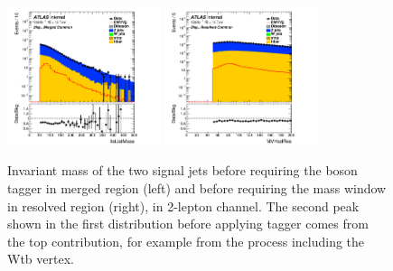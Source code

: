 \begin{figure}[H]
    \centering
     \includegraphics[width=0.40\textwidth]{figures/2lep/dataMC/C_0ptag1pfat0pjet_0ptv_MergedCommon_fatJetMass_Log} 
     \includegraphics[width=0.40\textwidth]{figures/2lep/dataMC/C_0ptag2pjet_0ptv_ResolvedCommon_MVHadRes_Log}
    \caption{Invariant mass of the two signal jets before requiring the boson tagger in merged region (left) and before requiring the mass window in resolved region (right), in 2-lepton channel. 
    The second peak shown in the first distribution before applying tagger comes from the top contribution, for example from the process including the Wtb vertex.
    }
    \label{fig:MVHadResSR}
\end{figure}

